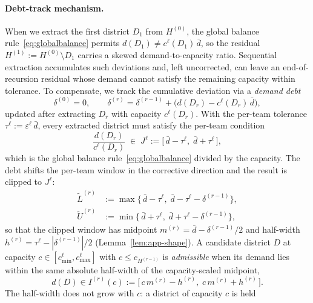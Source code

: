 \documentclass[11pt]{article}
\theoremstyle{definition}
\begin{document}
\paragraph{Debt-track mechanism.}
When we extract the first district $D_1$ from $H^{(0)}$, the global balance
rule~\eqref{eq:globalbalance} permits $d(D_1)\neq c^{\ell}(D_1)\,\bar d$, so
the residual $H^{(1)} := H^{(0)}\setminus D_1$ carries a skewed
demand-to-capacity ratio. Sequential extraction accumulates such deviations
and, left uncorrected, can leave an end-of-recursion residual whose demand
cannot satisfy the remaining capacity within tolerance. To compensate, we
track the cumulative deviation via a \emph{demand debt}
\begin{equation}\label{eq:delta}
    \delta^{(0)} = 0, \qquad
    \delta^{(r)} = \delta^{(r-1)} + \bigl(d(D_r) - c^{\ell}(D_r)\,\bar{d}\bigr),
\end{equation}
updated after extracting $D_r$ with capacity $c^\ell(D_r)$. With the
per-team tolerance $\tau^{\ell} := \varepsilon^{\ell}\,\bar d$, every
extracted district must satisfy the per-team condition
\begin{equation}\label{eq:per-team-window}
   \frac{d(D_r)}{c^{\ell}(D_r)} \;\in\; J^{\ell} :=
   \bigl[\,\bar d-\tau^{\ell},\; \bar d+\tau^{\ell}\,\bigr],
\end{equation}
which is the global balance rule~\eqref{eq:globalbalance} divided by the
capacity. The debt shifts the per-team window in the corrective direction
and the result is clipped to $J^{\ell}$:
\begin{align}
    \widetilde L^{(r)} &:= \max\bigl\{\,\bar d-\tau^{\ell},\;
        \bar d-\tau^{\ell}-\delta^{(r-1)}\bigr\}, \label{eq:Li} \\
    \widetilde U^{(r)} &:= \min\bigl\{\,\bar d+\tau^{\ell},\;
        \bar d+\tau^{\ell}-\delta^{(r-1)}\bigr\}, \label{eq:Ui}
\end{align}
so that the clipped window has midpoint $m^{(r)} = \bar d-\delta^{(r-1)}/2$
and half-width $h^{(r)} = \tau^{\ell}-|\delta^{(r-1)}|/2$
(Lemma~\ref{lem:app-shape}). A candidate district $D$ at capacity
$c\in[c^{\ell}_{\min},c^{\ell}_{\max}]$ with $c\le c_{H^{(r-1)}}$ is
\emph{admissible} when its demand lies within the same absolute half-width
of the capacity-scaled midpoint,
\begin{equation}\label{eq:window}
    d(D) \in I^{(r)}(c) := \bigl[\,c\,m^{(r)}-h^{(r)},\; c\,m^{(r)}+h^{(r)}\,\bigr].
\end{equation}
The half-width does not grow with $c$: a district of capacity $c$ is held
\end{document}
